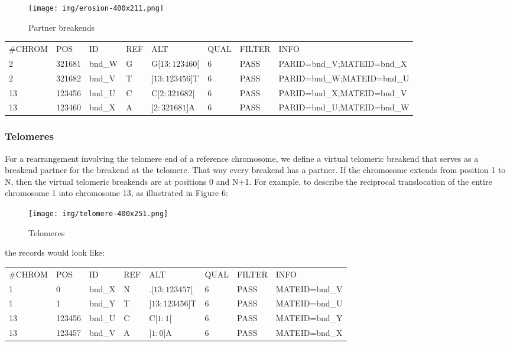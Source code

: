 \documentclass[8pt]{article}
\begin{document}
\begin{figure}[ht]
\centering
\texttt{[image: img/erosion-400x211.png]}
\caption{Partner breakends}
\end{figure}

\vspace{0.3cm}
\small
\begin{tabular}{ l l l l l l l l }
\#CHROM & POS & ID & REF & ALT & QUAL & FILTER & INFO \\
2 & 321681 & bnd\_W & G & G$[13:123460[$ & 6 & PASS & PARID=bnd\_V;MATEID=bnd\_X \\
2 & 321682 & bnd\_V & T & $]13:123456]$T & 6 & PASS & PARID=bnd\_W;MATEID=bnd\_U \\
13 & 123456 & bnd\_U & C & C$[2:321682[$ & 6 & PASS & PARID=bnd\_X;MATEID=bnd\_V \\
13 & 123460 & bnd\_X & A & $]2:321681]$A & 6 & PASS & PARID=bnd\_U;MATEID=bnd\_W \\
\end{tabular}
\normalsize

\subsubsection{Telomeres}
For a rearrangement involving the telomere end of a reference chromosome, we define a virtual telomeric breakend that serves as a breakend partner for the breakend at the telomere.
That way every breakend has a partner.
If the chromosome extends from position 1 to N, then the virtual telomeric breakends are at positions 0 and N+1.
For example, to describe the reciprocal translocation of the entire chromosome 1 into chromosome 13, as illustrated in Figure 6:

\begin{figure}[h]
\centering
\texttt{[image: img/telomere-400x251.png]}
\caption{Telomeres}
\end{figure}

the records would look like:

\small
\begin{tabular}{ l l l l l l l l }
\#CHROM & POS & ID & REF & ALT & QUAL & FILTER & INFO \\
1 & 0 & bnd\_X & N & $.[13:123457[$ & 6 & PASS & MATEID=bnd\_V \\
1 & 1 & bnd\_Y & T & $]13:123456]$T & 6 & PASS & MATEID=bnd\_U \\
13 & 123456 & bnd\_U & C & C$[1:1[$ & 6 & PASS & MATEID=bnd\_Y \\
13 & 123457 & bnd\_V & A & $]1:0]$A & 6 & PASS & MATEID=bnd\_X \\
\end{tabular}
\normalsize
\end{document}
